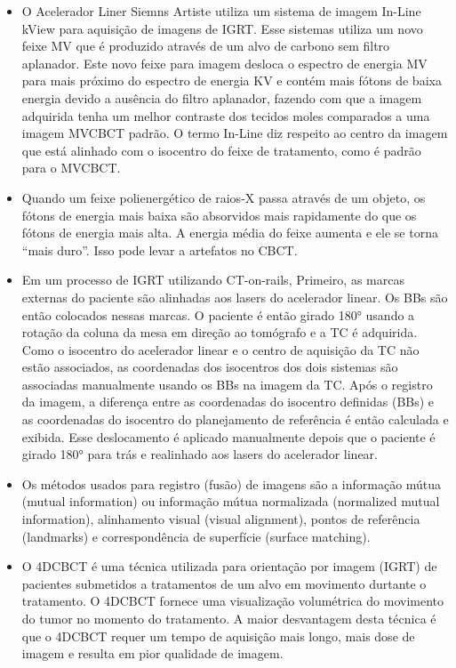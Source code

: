 \documentclass[11pt,a4paper]{article}
\newcounter{exemplo}
\begin{document}
\begin{exemplo}[12. IGRT ]
\begin{itemize}
        \item O Acelerador Liner Siemns Artiste utiliza um sistema de imagem In-Line kView para aquisição de imagens de IGRT. Esse sistemas utiliza um novo feixe MV que é produzido através de um alvo de carbono sem filtro aplanador. Este novo feixe para imagem desloca o espectro de energia MV para mais próximo do espectro de energia KV e contém mais fótons de baixa energia devido a ausência do filtro aplanador, fazendo com que a imagem adquirida tenha um melhor contraste dos tecidos moles comparados a uma imagem MVCBCT padrão. O termo In-Line diz respeito ao centro da imagem que está alinhado com o isocentro do feixe de tratamento, como é padrão para o MVCBCT.
        
        \item Quando um feixe polienergético de raios-X passa através de um objeto, os fótons de energia mais baixa são absorvidos mais rapidamente do que os fótons de energia mais alta. A energia média do feixe aumenta e ele se torna “mais duro”. Isso pode levar a artefatos no CBCT.
        
        \item Em um processo de IGRT utilizando CT-on-rails, Primeiro, as marcas externas do paciente são alinhadas aos lasers do acelerador linear. Os BBs são então colocados nessas marcas. O paciente é então girado 180° usando a rotação da coluna da mesa em direção ao tomógrafo e a TC é adquirida. Como o isocentro do acelerador linear e o centro de aquisição da TC não estão associados, as coordenadas dos isocentros dos dois sistemas são associadas manualmente usando os BBs na imagem da TC. Após o registro da imagem, a diferença entre as coordenadas do isocentro definidas (BBs) e as coordenadas do isocentro do planejamento de referência é então calculada e exibida. Esse deslocamento é aplicado manualmente depois que o paciente é girado 180° para trás e realinhado aos lasers do acelerador linear.
        
        \item Os métodos usados para registro (fusão) de imagens são a informação mútua (mutual information) ou informação mútua normalizada (normalized mutual information), alinhamento visual (visual alignment), pontos de referência (landmarks) e correspondência de superfície (surface matching).
        
        \item O 4DCBCT é uma técnica utilizada para orientação por imagem (IGRT) de pacientes submetidos a tratamentos de um alvo em movimento durtante o tratamento. O 4DCBCT fornece uma visualização volumétrica do movimento do tumor no momento do tratamento. A maior desvantagem desta técnica é que o 4DCBCT requer um tempo de aquisição mais longo, mais dose de imagem e resulta em pior qualidade de imagem.
        

\end{itemize}
\end{exemplo}
\end{document}
